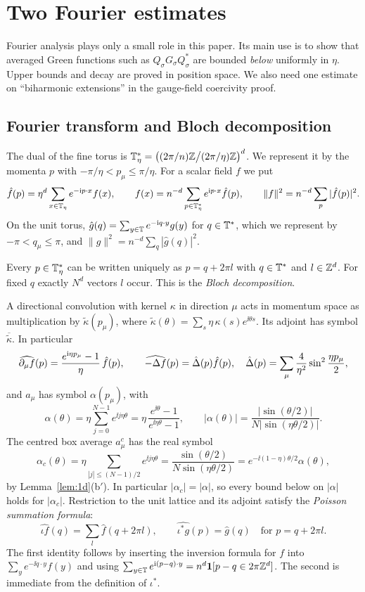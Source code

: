 \section{Two Fourier estimates}\label{sec:fourier}

Fourier analysis plays only a small role in this paper. Its main use is to show that averaged Green functions such as $Q_\sigma G_\sigma Q_\sigma^*$ are bounded \emph{below} uniformly in $\eta$. Upper bounds and decay are proved in position space. We also need one estimate on ``biharmonic extensions'' in the gauge-field coercivity proof.

\subsection{Fourier transform and Bloch decomposition}\label{ss:4.1}

The dual of the fine torus is $\mathbb T_\eta^*=\big((2\pi/n)\mathbb Z\big/(2\pi/\eta)\mathbb Z\big)^d$. We represent it by the momenta $p$ with $-\pi/\eta<p_\mu\le\pi/\eta$. For a scalar field $f$ we put
\[
\hat f(p)=\eta^d\sum_{x\in\mathbb T_\eta}e^{-\mathrm i p\cdot x}f(x),\qquad f(x)=n^{-d}\sum_{p\in\mathbb T_\eta^*}e^{\mathrm i p\cdot x}\hat f(p),\qquad \|f\|^2=n^{-d}\sum_p|\hat f(p)|^2 .
\]
On the unit torus, $\hat g(q)=\sum_{y\in\mathbb T}e^{-\mathrm i q\cdot y}g(y)$ for $q\in\mathbb T^*$, which we represent by $-\pi<q_\mu\le\pi$, and $\|g\|^2=n^{-d}\sum_q|\hat g(q)|^2$.

Every $p\in\mathbb T_\eta^*$ can be written uniquely as $p=q+2\pi l$ with $q\in\mathbb T^*$ and $l\in\mathbb Z^d$. For fixed $q$ exactly $N^d$ vectors $l$ occur. This is the \emph{Bloch decomposition}.

A directional convolution with kernel $\kappa$ in direction $\mu$ acts in momentum space as multiplication by $\tilde\kappa(p_\mu)$, where $\tilde\kappa(\theta)=\sum_s\eta\,\kappa(s)e^{\ii\theta s}$. Its adjoint has symbol $\overline{\tilde\kappa}$. In particular
\[
\widehat{\partial_\mu f}(p)=\frac{e^{\mathrm i\eta p_\mu}-1}\eta\,\hat f(p),\qquad
\widehat{-\Delta f}(p)=\hat{\Delta}(p)\hat f(p),\quad \hat{\Delta}(p)=\sum_\mu\frac4{\eta^2}\sin^2\frac{\eta p_\mu}2,
\]
and $a_\mu$ has symbol $\alpha(p_\mu)$, with
\[
\alpha(\theta)=\eta\sum_{j=0}^{N-1}e^{\ii j\eta\theta}=\eta\,\frac{e^{\ii\theta}-1}{e^{\ii\eta\theta}-1},\qquad |\alpha(\theta)|=\frac{|\sin(\theta/2)|}{N|\sin(\eta\theta/2)|}.
\]
The centred box average $a^c_\mu$ has the real symbol
\[
\alpha_c(\theta)=\eta\sum_{|j|\le(N-1)/2}e^{\ii j\eta\theta}=\frac{\sin(\theta/2)}{N\sin(\eta\theta/2)}=e^{-\ii(1-\eta)\theta/2}\alpha(\theta),
\]
by Lemma~\ref{lem:1d}(b$'$). In particular $|\alpha_c|=|\alpha|$, so every bound below on $|\alpha|$ holds for $|\alpha_c|$.
Restriction to the unit lattice and its adjoint satisfy the \emph{Poisson summation formula}:
\begin{equation}\label{eq:poisson}
\widehat{\iota f}(q)=\sum_{l}\hat f(q+2\pi l),\qquad \widehat{\iota^*g}(p)=\hat g(q)\quad\text{for }p=q+2\pi l .
\end{equation}
The first identity follows by inserting the inversion formula for $f$ into $\sum_ye^{-\ii q\cdot y}f(y)$ and using $\sum_{y\in\mathbb T}e^{\mathrm i(p-q)\cdot y}=n^d\mathbf 1[p-q\in2\pi\mathbb Z^d]$. The second is immediate from the definition of $\iota^*$.


